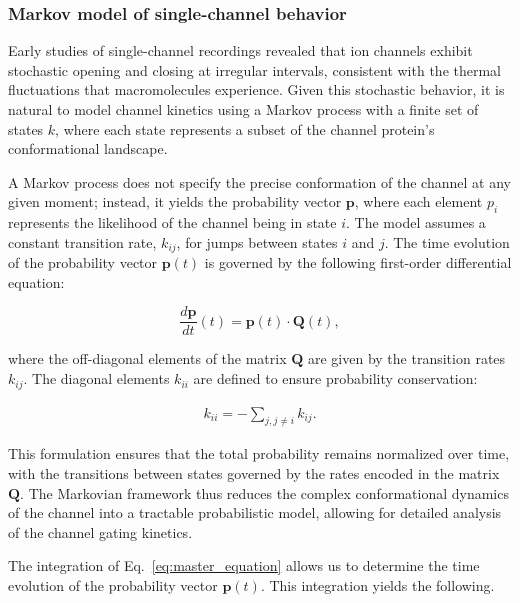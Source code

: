 \documentclass[pdflatex,sn-mathphys-num]{sn-jnl}%
\theoremstyle{thmstyleone}%
\theoremstyle{thmstyletwo}%
\theoremstyle{thmstylethree}%
\begin{document}
\subsubsection{Markov model of single-channel behavior}

Early studies of single-channel recordings revealed that ion channels exhibit stochastic opening and closing at irregular intervals, consistent with the thermal fluctuations that macromolecules experience. Given this stochastic behavior, it is natural to model channel kinetics using a Markov process with a finite set of states \( k \), where each state represents a subset of the channel protein’s conformational landscape. 

A Markov process does not specify the precise conformation of the channel at any given moment; instead, it yields the probability vector \( \boldsymbol{p} \), where each element \( p_i \) represents the likelihood of the channel being in state \( i \). The model assumes a constant transition rate, \( k_{ij} \), for jumps between states \( i \) and \( j \). The time evolution of the probability vector \( \boldsymbol{p}(t) \) is governed by the following first-order differential equation:

\begin{equation}
	\frac{d \boldsymbol{p}}{dt}(t) = \boldsymbol{p}(t) \cdot \boldsymbol{Q}(t),
	\label{eq:master_equation}
\end{equation}

where the off-diagonal elements of the matrix \( \boldsymbol{Q} \) are given by the transition rates \( k_{ij} \). The diagonal elements \( k_{ii} \) are defined to ensure probability conservation:

\begin{align}
	k_{ii} = -\sum_{j, j \neq i} k_{ij}.
	\label{eq:Q_diagonal_element}
\end{align}

This formulation ensures that the total probability remains normalized over time, with the transitions between states governed by the rates encoded in the matrix \( \boldsymbol{Q} \). The Markovian framework thus reduces the complex conformational dynamics of the channel into a tractable probabilistic model, allowing for detailed analysis of the channel gating kinetics.


The integration of Eq.~\ref{eq:master_equation} allows us to determine the time evolution of the probability vector \( \boldsymbol{p}(t) \). This integration yields the following.
\end{document}
